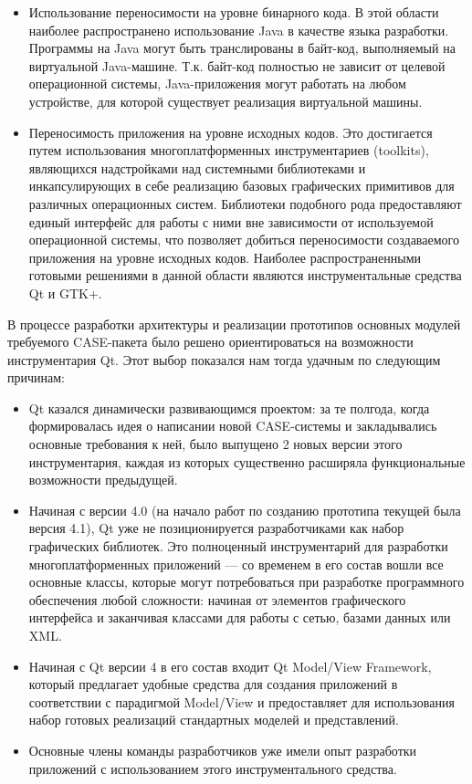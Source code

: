 \documentclass[a5paper]{article}
\begin{document}
\begin{itemize}
  \item Использование переносимости на уровне бинарного кода. В этой области
        наиболее распространено использование Java в
        качестве языка разработки. Программы на Java могут быть транслированы в
        байт-код, выполняемый на виртуальной Java-машине. Т.к. байт-код полностью не
        зависит от целевой операционной системы, Java-приложения могут работать
        на любом устройстве, для которой существует реализация виртуальной машины.
  \item Переносимость приложения на уровне исходных кодов. Это достигается путем
        использования многоплатформенных инструментариев
        (toolkits), являющихся надстройками над
        системными библиотеками и инкапсулирующих в себе реализацию базовых
        графических примитивов для различных операционных систем. Библиотеки
        подобного рода предоставляют единый интерфейс для работы с ними вне
        зависимости от используемой операционной системы, что позволяет
        добиться переносимости создаваемого приложения на уровне исходных
        кодов. Наиболее распространенными готовыми решениями в данной области
        являются инструментальные средства Qt и GTK+.
\end{itemize}

В процессе разработки архитектуры и реализации прототипов основных
модулей требуемого CASE-пакета было решено
ориентироваться на возможности инструментария
Qt. Этот выбор показался нам тогда удачным
по следующим причинам:

\begin{itemize}
  \item Qt казался динамически развивающимся
        проектом: за те полгода, когда формировалась идея о написании новой
        CASE-системы и закладывались основные
        требования к ней, было выпущено 2 новых версии этого инструментария,
        каждая из которых существенно расширяла функциональные возможности
        предыдущей.
  \item
        Начиная с версии 4.0 (на начало работ по созданию прототипа текущей была
        версия 4.1), Qt уже не позиционируется
        разработчиками как набор графических библиотек. Это полноценный
        инструментарий для разработки многоплатформенных приложений --- со
        временем в его состав вошли все основные классы, которые могут
        потребоваться при разработке программного обеспечения любой сложности:
        начиная от элементов графического интерфейса и заканчивая классами для
        работы с сетью, базами данных или XML.
  \item Начиная с Qt версии 4 в его состав входит Qt Model/View
        Framework, который предлагает удобные
        средства для создания приложений в соответствии с парадигмой
        Model/View и предоставляет для использования набор готовых реализаций стандартных
        моделей и представлений.
  \item Основные члены команды разработчиков уже имели опыт разработки
        приложений с использованием этого инструментального средства.
\end{itemize}
\end{document}
